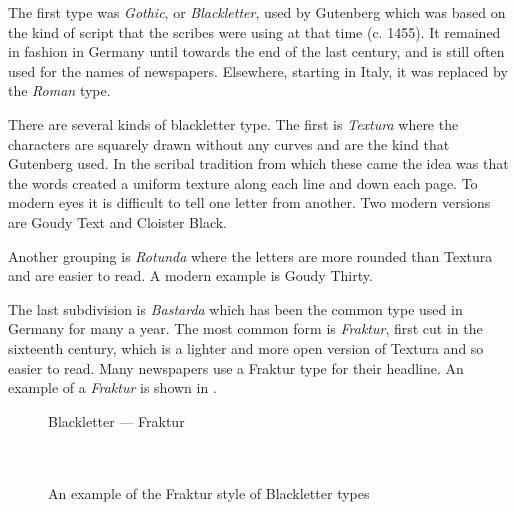 \documentclass[10pt,a4paper,extrafontsizes]{memoir}
\begin{document}
\begin{paracol}{2}
\switchEng
    The first type was \emph{Gothic}, or 
\emph{Blackletter}, used by 
Gutenberg which was based on
the kind of script that the scribes were using at that time (c. 1455). 
It remained in
fashion in Germany until towards the end of the last century, and is still
often used for the names of newspapers. Elsewhere, starting in Italy, 
it was replaced by the \emph{Roman} type. 

    There are several kinds of blackletter type. The first is 
\emph{Textura} where the characters are squarely 
drawn without any curves
and are the kind that Gutenberg used. 
In the scribal tradition from which these came the idea was that the words
created a uniform texture along each line and down each page. To modern eyes it
is difficult to tell one letter from another. Two modern versions are
Goudy Text and 
Cloister Black.

    Another grouping is \emph{Rotunda} where the letters are 
more rounded than Textura and are easier to read. A modern example is 
Goudy Thirty.

    The last subdivision is \emph{Bastarda} which has been
the common type used in Germany for many a year. The most common form
is \emph{Fraktur}, first cut in the sixteenth century, which
is a lighter and more open version of Textura and so easier
to read. Many newspapers use a Fraktur type for their headline. An
example of a \emph{Fraktur}
is shown in .%
\end{paracol}

\begin{figure}
\centering
{\centering{}\selectfont
  Blackletter --- Fraktur \\
  \UCalphabet \\
  \LCalphabet \\
  \fox\par}
\caption{An example of the Fraktur style of Blackletter types} \label{fig:fraktur}
\end{figure}
\end{document}
